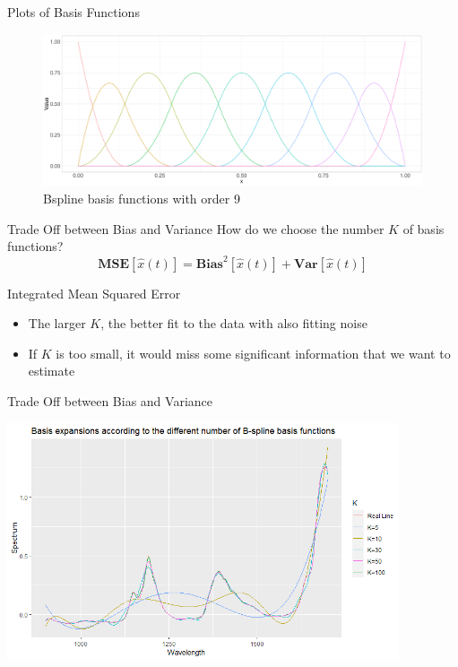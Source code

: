\documentclass{beamer}
\begin{document}
	\begin{frame}{Plots of Basis Functions}
		\begin{figure}
			\includegraphics[height = 4.5cm]{../Graphics/Bspline_Basis.pdf}
			\caption {Bspline basis functions with order 9}
		\end{figure}
	\end{frame}
	
	\begin{frame}{Trade Off between Bias and Variance}
		How do we choose the number $K$ of basis functions?
		$$\textbf{MSE}[\hat{x}(t)] = \textbf{Bias}^2[\hat{x}(t)] + \textbf{Var}[\hat{x}(t)]$$
		
		{\color{red} Integrated Mean Squared Error}
		\begin{itemize}
			\item The larger $K$, the better fit to the data with also fitting noise
			\item If $K$ is too small, it would miss some significant information that we want to estimate 
		\end{itemize}
	\end{frame}
	
	\begin{frame}{Trade Off between Bias and Variance}
		\begin{minipage}[t]{\textwidth}
			\includegraphics[height = 7cm]{../Graphics/Tradeoff.png}
		\end{minipage}
	\end{frame}
\end{document}
